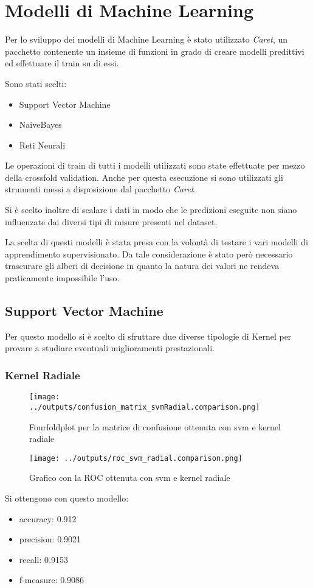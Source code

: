 \chapter{Modelli di Machine Learning}
Per lo sviluppo dei modelli di Machine Learning è stato utilizzato
\textit{Caret}, un pacchetto contenente un insieme di funzioni in grado di 
creare modelli predittivi ed effettuare il train su di essi.

Sono stati scelti:
\begin{itemize}
    \item Support Vector Machine
    \item NaiveBayes
    \item Reti Neurali
\end{itemize}

Le operazioni di train di tutti i modelli utilizzati sono state effettuate 
per mezzo della crossfold validation. Anche per questa esecuzione si sono utilizzati 
gli strumenti messi a disposizione dal pacchetto \textit{Caret}.

Si è scelto inoltre di scalare i dati in modo che le predizioni eseguite non siano 
influenzate dai diversi tipi di misure presenti nel dataset.

La scelta di questi modelli è stata presa con la volontà di testare i vari
modelli di apprendimento supervisionato.
Da tale considerazione è stato però necessario trascurare gli alberi di 
decisione in quanto la natura dei valori ne rendeva praticamente impossibile 
l'uso.

\section{Support Vector Machine}
Per questo modello si è scelto di sfruttare due diverse tipologie di Kernel
per provare a studiare eventuali miglioramenti prestazionali. 
\subsection{Kernel Radiale}

\begin{figure}[H]
    \centering
    \texttt{[image: ../outputs/confusion\_matrix\_svmRadial.comparison.png]}
    \caption{Fourfoldplot per la matrice di confusione ottenuta con svm e kernel radiale}
\end{figure}
\begin{figure}[H]
    \centering
    \texttt{[image: ../outputs/roc\_svm\_radial.comparison.png]}
    \caption{Grafico con la ROC ottenuta con svm e kernel radiale}
\end{figure}
Si ottengono con questo modello:
\begin{itemize}
    \item accuracy: 0.912 
    \item precision: 0.9021
    \item recall: 0.9153
    \item f-measure: 0.9086 
\end{itemize}

